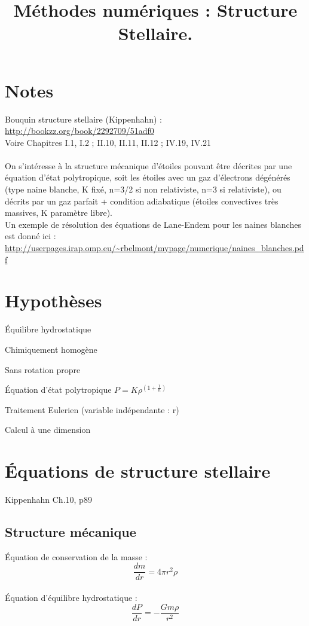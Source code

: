 \documentclass[a4paper,10pt]{article}
\begin{document}
\title{Méthodes numériques : Structure Stellaire.}
\maketitle
\tableofcontents

\section*{Notes}
Bouquin structure stellaire (Kippenhahn) :\\
\url{http://bookzz.org/book/2292709/51adf0}\\
Voire Chapitres I.1, I.2 ; II.10, II.11, II.12 ; IV.19, IV.21\\
\\
On s'intéresse à la structure mécanique d'étoiles pouvant être décrites par une équation d'état polytropique, soit les étoiles avec un gaz d'électrons dégénérés (type naine blanche, K fixé, n=3/2 si non relativiste, n=3 si relativiste), ou décrits par un gaz parfait + condition adiabatique (étoiles convectives très massives, K paramètre libre).\\
Un exemple de résolution des équations de Lane-Endem pour les naines blanches est donné ici : \url{http://userpages.irap.omp.eu/~rbelmont/mypage/numerique/naines_blanches.pdf}

\newpage
\section{Hypothèses}
\begin{list}{•}{}
\item Équilibre hydrostatique
\item Chimiquement homogène
\item Sans rotation propre
\item Équation d'état polytropique $ P = K \rho^{(1+\frac{1}{n})} $
\item Traitement Eulerien (variable indépendante : r)
\item Calcul à une dimension
\end{list}

\section{Équations de structure stellaire}
Kippenhahn Ch.10, p89
\subsection{Structure mécanique}
Équation de conservation de la masse :
\begin{equation}
\frac{d m}{d r} = 4 \pi r^2 \rho
\end{equation}
\\
Équation d'équilibre hydrostatique : 
\begin{equation}
\frac{d P}{d r} = - \frac{G m \rho}{r^2}
\end{equation}
\end{document}
